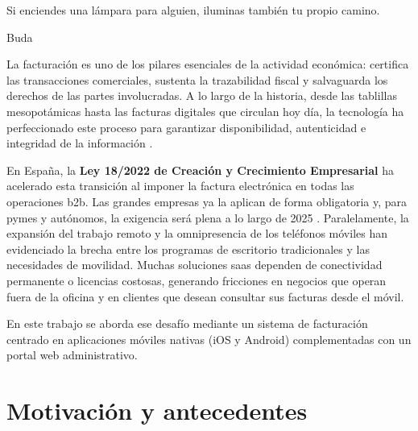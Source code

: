 \begin{large}
\epigraph{Si enciendes una lámpara para alguien, iluminas también tu propio camino.}{Buda}

La facturación es uno de los pilares esenciales de la actividad económica: certifica las transacciones comerciales, sustenta la trazabilidad fiscal y salvaguarda los derechos de las partes involucradas. A lo largo de la historia, desde las tablillas mesopotámicas hasta las facturas digitales que circulan hoy día, la tecnología ha perfeccionado este proceso para garantizar disponibilidad, autenticidad e integridad de la información \cite{origen_facturas}.

En España, la \textbf{Ley 18/2022 de Creación y Crecimiento Empresarial} ha acelerado esta transición al imponer la factura electrónica en todas las operaciones \gls{b2b}. Las grandes empresas ya la aplican de forma obligatoria y, para pymes y autónomos, la exigencia será plena a lo largo de 2025 \cite{ley18_2022}. Paralelamente, la expansión del trabajo remoto y la omnipresencia de los teléfonos móviles han evidenciado la brecha entre los programas de escritorio tradicionales y las necesidades de movilidad. Muchas soluciones \gls{saas} dependen de conectividad permanente o licencias costosas, generando fricciones en negocios que operan fuera de la oficina y en clientes que desean consultar sus facturas desde el móvil.

En este trabajo se aborda ese desafío mediante un sistema de facturación centrado en aplicaciones móviles nativas (iOS y Android) complementadas con un portal web administrativo.
\end{large}

\section{Motivación y antecedentes}

